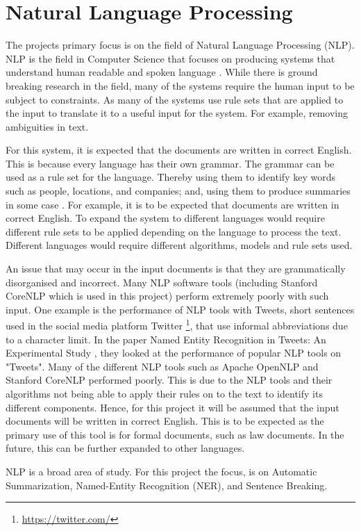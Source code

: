 \section{Natural Language Processing}
\par The projects primary focus is on the field of Natural Language Processing (NLP). NLP is the field in Computer Science that focuses on producing systems that understand human readable and spoken language \cite{nlp}. While there is ground breaking research in the field, many of the systems require the human input to be subject to constraints. As many of the systems use rule sets that are applied to the input to translate it to a useful input for the system. For example, removing ambiguities in text. 
\par For this system, it is expected that the documents are written in correct English. This is because every language has their own grammar. The grammar can be used as a rule set for the language. Thereby using them to identify key words such as people, locations, and companies; and, using them to produce summaries in some case \cite{dorrzajicschwartz2003}. For example, it is to be expected that documents are written in correct English. To expand the system to different languages would require different rule sets to be applied depending on the language to process the text. Different languages would require different algorithms, models and rule sets used.
\par An issue that may occur in the input documents is that they are grammatically disorganised and incorrect. Many NLP software tools (including Stanford CoreNLP which is used in this project) perform extremely poorly with such input. One example is the performance of NLP tools with Tweets, short sentences used in the social media platform Twitter \footnote{\url{https://twitter.com/}}, that use informal abbreviations due to a character limit. In the paper Named Entity Recognition in Tweets: An Experimental Study \cite{ritter2011}, they looked at the performance of popular NLP tools on "Tweets". Many of the different NLP tools such as Apache OpenNLP and Stanford CoreNLP performed poorly. This is due to the NLP tools and their algorithms not being able to apply their rules on to the text to identify its different components. Hence, for this project it will be assumed that the input documents will be written in correct English. This is to be expected as the primary use of this tool is for formal documents, such as law documents. In the future, this can be further expanded to other languages.
\par NLP is a broad area of study. For this project the focus, is on Automatic Summarization, Named-Entity Recognition (NER), and Sentence Breaking.

